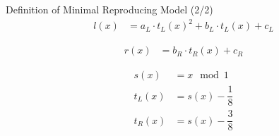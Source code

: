\begin{frame}{Definition of Minimal Reproducing Model (2/2)}
    \vspace{-3.0em}
    \begin{align}
        l(x) & = a_L \cdot t_L(x)^2 + b_L \cdot t_L(x) + c_L
    \end{align}

    \begin{align}
        r(x) & = b_R \cdot t_R(x) + c_R
    \end{align}

    \begin{align}
        s(x)   & = x \mod 1            \\
        t_L(x) & = s(x) - \dfrac{1}{8} \\
        t_R(x) & = s(x) - \dfrac{3}{8}
    \end{align}
\end{frame}